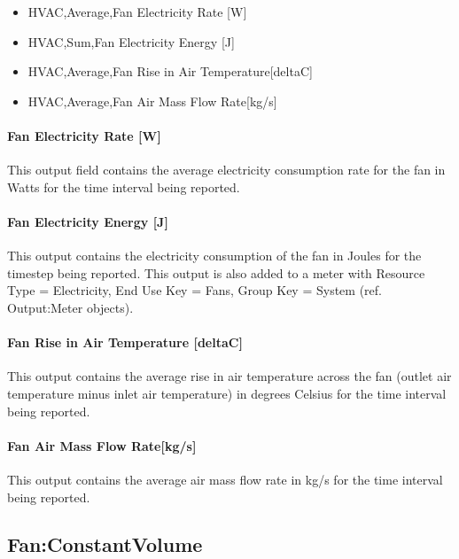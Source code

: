 \begin{itemize}
\item
HVAC,Average,Fan Electricity Rate {[}W{]}
\item
HVAC,Sum,Fan Electricity Energy {[}J{]}
\item
HVAC,Average,Fan Rise in Air Temperature{[}deltaC{]}
\item
HVAC,Average,Fan Air Mass Flow Rate{[}kg/s{]}
\end{itemize}

\paragraph{Fan Electricity Rate {[}W{]}}\label{fan-electric-power-fansysmodel}

This output field contains the average electricity consumption rate for the fan in Watts for the time interval being reported.

\paragraph{Fan Electricity Energy {[}J{]}}\label{fan-electric-energy-fansysmodel}

This output contains the electricity consumption of the fan in Joules for the timestep being reported. This output is also added to a meter with Resource Type = Electricity, End Use Key = Fans, Group Key = System (ref. Output:Meter objects).

\paragraph{Fan Rise in Air Temperature {[}deltaC{]}}\label{fan-rise-in-air-temperature-deltac-fansysmodel}

This output contains the average rise in air temperature across the fan (outlet air temperature minus inlet air temperature) in degrees Celsius for the time interval being reported.

\paragraph{Fan Air Mass Flow Rate{[}kg/s{]}}\label{fan-air-mass-flow-fansysmodel}

This output contains the average air mass flow rate in kg/s for the time interval being reported.

\subsection{Fan:ConstantVolume}\label{fanconstantvolume}

